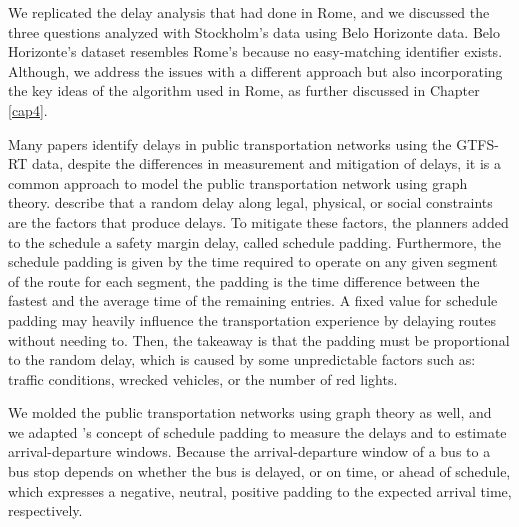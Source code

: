 We replicated the delay analysis that  had done in Rome, and we discussed the three questions analyzed with Stockholm's data using
Belo Horizonte data. Belo Horizonte's dataset resembles Rome's because no easy-matching identifier exists. 
Although, we address the issues
with a different approach but also incorporating the key ideas of the algorithm used in Rome, as further discussed in Chapter \ref{cap4}.


Many papers identify delays in public transportation networks using the GTFS-RT 
data, despite the differences in measurement and mitigation of delays, it is
a common approach to model the public transportation network using graph theory.
 describe that a random delay along legal, physical, or social constraints are the factors that produce delays. To mitigate these factors,
the planners added to the schedule 
a safety margin delay, called schedule padding. 
Furthermore, the schedule padding
is given by the time required to operate on any given segment of the route for
each segment, the padding is the time difference between the fastest and the average time 
of the remaining entries.
A fixed value for schedule padding may heavily influence
the transportation experience by delaying routes without needing to. Then, the takeaway is that
the padding must be proportional to the random delay, which is caused by some unpredictable factors such as: 
traffic conditions, wrecked vehicles, or the number of red lights. 

We molded the public transportation networks using graph theory as well,
and we adapted 's concept of schedule padding to 
measure the 
delays and to estimate arrival-departure windows. Because the 
arrival-departure window of a bus to a bus stop depends on whether the bus is
delayed, or on time, or ahead of schedule, which expresses a negative,
neutral, positive padding to the expected arrival time, respectively.



